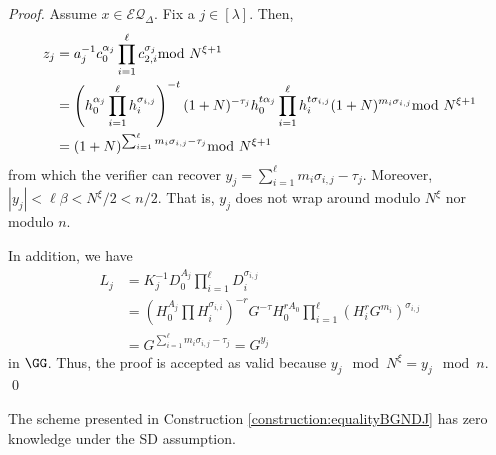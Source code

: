 \begin{proof}
Assume $x\in\mathcal{EQ}_\Delta$. Fix a $j\in [\lambda]$. Then, \begin{align*}
    z_{j}&=a_{j}^{-1}c_0^{\alpha_j}\prod_{i=1}^\ell c_{2,i}^{\sigma_{j}} \smod N^{\xi+1}\\ 
    &=\left(h_0^{\alpha_j}\prod_{i=1}^{\ell} h_i^{\sigma_{i,j}}\right)^{-t}(1+N)^{-\tau_{j}}h_0^{t\alpha_j}\prod_{i=1}^\ell h_i^{t\sigma_{i,j}} (1+N)^{m_i\sigma_{i,j}} \smod N^{\xi+1}\\ 
    &=(1+N)^{\sum_{i=1}^\ell m_i\sigma_{i,j}-\tau_{j}}\smod N^{\xi+1}
\end{align*} 
from which the verifier can recover $y_{j}=\sum_{i=1}^\ell m_i\sigma_{i,j}-\tau_{j}$.
 Moreover, $|y_j|<\ell \beta <N^\xi/2<n/2$. That is, $y_j$ does not wrap around modulo $N^\xi$ nor modulo $n$. 

In addition, we have \begin{align*}
    L_j &= K_j^{-1} D_0^{A_j}\prod_{i=1}^\ell D_i^{\sigma_{i,j}} \\ 
    &= \left  (H_0^{A_j}\prod H_i^{\sigma_{i,i}}\right)^{-r} G^{-\tau} H_0^{rA_0}\prod_{i=1}^\ell (H_i^rG^{m_i})^{\sigma_{i,j}}\\
    &= G^{\sum_{i=1}^\ell m_i\sigma_{i,j} -\tau_{j}} =G^{y_j}
\end{align*} in $\GG$.
Thus, the proof is accepted as valid because $y_j\mod N^\xi=y_j\mod n$.
\qed
\end{proof}


\begin{lemma}
The scheme presented in Construction \ref{construction:equalityBGNDJ} has zero knowledge under the SD assumption.
\end{lemma}



